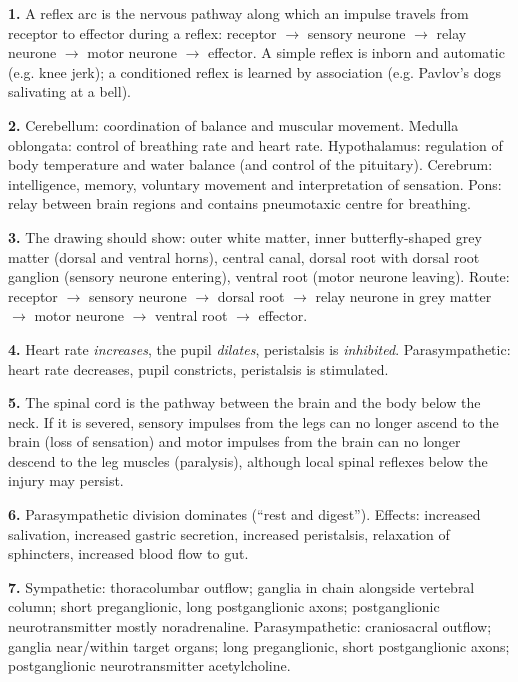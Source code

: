 \documentclass[11pt]{article}
\begin{document}
\begin{corrige}[Exercise 1]
\textbf{1.} A reflex arc is the nervous pathway along which an impulse travels from receptor to effector during a reflex: receptor $\rightarrow$ sensory neurone $\rightarrow$ relay neurone $\rightarrow$ motor neurone $\rightarrow$ effector. A simple reflex is inborn and automatic (e.g. knee jerk); a conditioned reflex is learned by association (e.g. Pavlov's dogs salivating at a bell).

\textbf{2.} Cerebellum: coordination of balance and muscular movement. Medulla oblongata: control of breathing rate and heart rate. Hypothalamus: regulation of body temperature and water balance (and control of the pituitary). Cerebrum: intelligence, memory, voluntary movement and interpretation of sensation. Pons: relay between brain regions and contains pneumotaxic centre for breathing.

\textbf{3.} The drawing should show: outer white matter, inner butterfly-shaped grey matter (dorsal and ventral horns), central canal, dorsal root with dorsal root ganglion (sensory neurone entering), ventral root (motor neurone leaving). Route: receptor $\rightarrow$ sensory neurone $\rightarrow$ dorsal root $\rightarrow$ relay neurone in grey matter $\rightarrow$ motor neurone $\rightarrow$ ventral root $\rightarrow$ effector.

\textbf{4.} Heart rate \emph{increases}, the pupil \emph{dilates}, peristalsis is \emph{inhibited}. Parasympathetic: heart rate decreases, pupil constricts, peristalsis is stimulated.

\textbf{5.} The spinal cord is the pathway between the brain and the body below the neck. If it is severed, sensory impulses from the legs can no longer ascend to the brain (loss of sensation) and motor impulses from the brain can no longer descend to the leg muscles (paralysis), although local spinal reflexes below the injury may persist.

\textbf{6.} Parasympathetic division dominates (``rest and digest''). Effects: increased salivation, increased gastric secretion, increased peristalsis, relaxation of sphincters, increased blood flow to gut.

\textbf{7.} Sympathetic: thoracolumbar outflow; ganglia in chain alongside vertebral column; short preganglionic, long postganglionic axons; postganglionic neurotransmitter mostly noradrenaline. Parasympathetic: craniosacral outflow; ganglia near/within target organs; long preganglionic, short postganglionic axons; postganglionic neurotransmitter acetylcholine.
\end{corrige}
\end{document}
